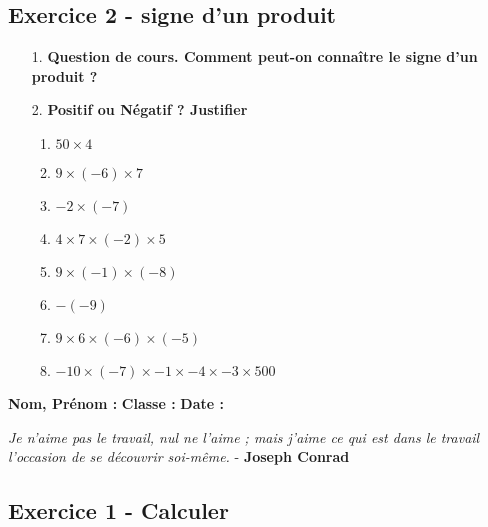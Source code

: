 \documentclass[11pt]{article}
\newcommand{\Pointilles}[1][3]{%
  \multido{}{#1}{\makebox[\linewidth]{\dotfill}\\[\parskip]
}}
\begin{document}
\subsection*{Exercice 2 - signe d'un produit}

\begin{enumerate}
    \item[1.] \textbf{Question de cours. Comment peut-on connaître le signe d'un produit ?} \\
    \Pointilles[3]

    \item[2.] \textbf{Positif ou Négatif ? Justifier} 
    \begin{enumerate}
        \item $50 \times 4$ \dotfill
        \item $9 \times (-6) \times 7$ \dotfill
        \item $-2 \times (-7)$ \dotfill
        \item $4 \times 7 \times (-2) \times 5$ \dotfill
        \item $9 \times (-1) \times (-8)$ \dotfill
        \item $ -(-9)$ \dotfill
        \item $9 \times 6 \times (-6) \times (-5)$ \dotfill
        \item $-10 \times (-7) \times -1 \times - 4 \times -3 \times 500$ \dotfill
    \end{enumerate}
\end{enumerate}

\newpage

\textbf{Nom, Prénom :} \hspace{8cm} \textbf{Classe :} \hspace{3cm} \textbf{Date :}\\
\vspace{-0.8cm}
\begin{center}
  \textit{Je n'aime pas le travail, nul ne l'aime ; mais j'aime ce qui est dans le travail l'occasion de se découvrir soi-même.}  - \textbf{Joseph Conrad}
\end{center}
\vspace{-0.8cm}

\subsection*{Exercice 1 - Calculer}
\end{document}
